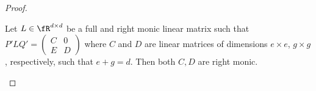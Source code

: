 \begin{proof}
%
%

\begin{claim} \label{monic-monic}
Let $L \in \fR^{d \times d}$ be a full and right monic linear matrix
such that $P'LQ' = \left(
\begin{array}{cc}
C & 0 \\
E & D
\end{array}
\right)$ where $C$ and $D$ are linear matrices of dimensions $e \times
e$, $g \times g$, respectively, such that $e+g = d$. Then both $C, D$
are right monic.
\end{claim}

\end{proof}
